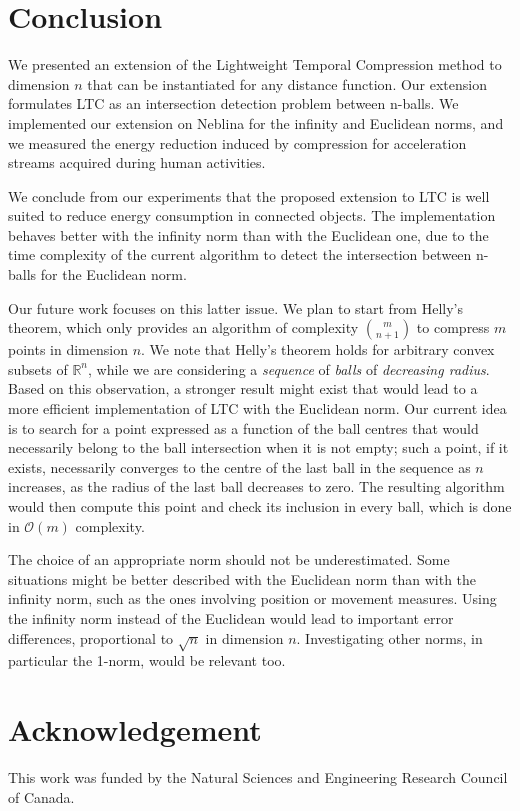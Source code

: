\documentclass[10pt, conference, compsocconf]{IEEEtran}
\begin{document}
\section{Conclusion}

We presented an extension of the Lightweight Temporal Compression 
method to dimension $n$ that can be instantiated for any distance 
function. Our extension formulates LTC as an intersection detection 
problem between n-balls. We implemented our extension on Neblina for the 
infinity and Euclidean norms, and we measured the energy reduction 
induced by compression for acceleration streams acquired during
 human activities.

We conclude from our experiments that the proposed extension to LTC is 
well suited to reduce energy consumption in connected objects. The 
implementation behaves better with the infinity norm than with the 
Euclidean one, due to the time complexity of the current algorithm to 
detect the intersection between n-balls for the Euclidean norm. 

Our future work focuses on this latter issue. We plan to start from 
Helly's theorem, which only provides an algorithm of complexity ${m 
\choose n+1}$ to compress $m$ points in 
dimension $n$. We note that Helly's theorem holds for arbitrary convex 
subsets of $\mathbb{R}^n$, while we are considering a \emph{sequence} 
of \emph{balls} of \emph{decreasing radius}. Based on this 
observation, a stronger result might exist that would lead to a more 
efficient implementation of LTC with the Euclidean norm. Our current 
idea is to search for a point expressed as a function of the ball centres that would 
necessarily belong to the ball intersection when it is not empty; such 
a point, if it exists, necessarily converges to the centre of the last 
ball in the sequence as $n$ increases, as the radius of the last ball 
decreases to zero. The resulting algorithm would then compute this 
point and check its inclusion in every ball, which is done in 
$\mathcal{O}(m)$ complexity.

The choice of an appropriate norm should not be underestimated. Some 
situations might be better described with the Euclidean norm than with 
the infinity norm, such as the ones involving position or movement 
measures. Using the infinity norm instead of the Euclidean would lead 
to important error differences, proportional to $\sqrt{n}$ in dimension 
$n$. Investigating other norms, in 
particular the 1-norm, would be relevant too.

\section*{Acknowledgement}
This work was funded by the Natural 
Sciences and Engineering Research Council of Canada.



\end{document}
